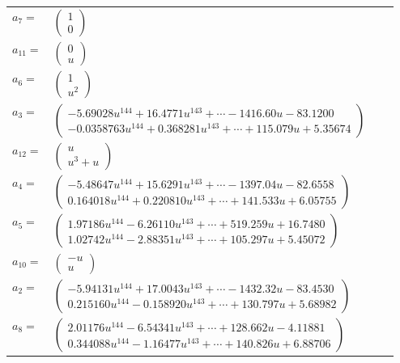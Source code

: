 \documentclass[1p]{elsarticle_modified}
\theoremstyle{definition}
\begin{document}
\begin{tabular}{m{7pt} m{180pt} m{7pt} m{180pt} }
\flushright $a_{7}=$&$\begin{pmatrix}1\\0\end{pmatrix}$ \\
\flushright $a_{11}=$&$\begin{pmatrix}0\\u\end{pmatrix}$ \\
\flushright $a_{6}=$&$\begin{pmatrix}1\\u^2\end{pmatrix}$ \\
\flushright $a_{3}=$&$\begin{pmatrix}-5.69028 u^{144}+16.4771 u^{143}+\cdots-1416.60 u-83.1200\\-0.0358763 u^{144}+0.368281 u^{143}+\cdots+115.079 u+5.35674\end{pmatrix}$ \\
\flushright $a_{12}=$&$\begin{pmatrix}u\\u^3+u\end{pmatrix}$ \\
\flushright $a_{4}=$&$\begin{pmatrix}-5.48647 u^{144}+15.6291 u^{143}+\cdots-1397.04 u-82.6558\\0.164018 u^{144}+0.220810 u^{143}+\cdots+141.533 u+6.05755\end{pmatrix}$ \\
\flushright $a_{5}=$&$\begin{pmatrix}1.97186 u^{144}-6.26110 u^{143}+\cdots+519.259 u+16.7480\\1.02742 u^{144}-2.88351 u^{143}+\cdots+105.297 u+5.45072\end{pmatrix}$ \\
\flushright $a_{10}=$&$\begin{pmatrix}- u\\u\end{pmatrix}$ \\
\flushright $a_{2}=$&$\begin{pmatrix}-5.94131 u^{144}+17.0043 u^{143}+\cdots-1432.32 u-83.4530\\0.215160 u^{144}-0.158920 u^{143}+\cdots+130.797 u+5.68982\end{pmatrix}$ \\
\flushright $a_{8}=$&$\begin{pmatrix}2.01176 u^{144}-6.54341 u^{143}+\cdots+128.662 u-4.11881\\0.344088 u^{144}-1.16477 u^{143}+\cdots+140.826 u+6.88706\end{pmatrix}$ \\

\end{tabular}
\end{document}
